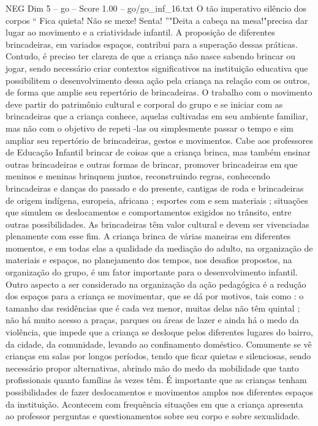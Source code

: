 \begin{textsample}{NEG Dim 5 – go – Score 1.00 – go/go\_inf\_16.txt}
O tão imperativo silêncio dos corpos “ Fica quieta!
Não se mexe!
Senta! ”"Deita a cabeça na mesa!"precisa dar lugar ao movimento e a criatividade infantil.
A proposição de diferentes brincadeiras, em variados espaços, contribui para a superação dessas práticas.
Contudo, é preciso ter clareza de que a criança não nasce sabendo brincar ou jogar, sendo necessário criar contextos significativos na instituição educativa que possibilitem o desenvolvimento dessa ação pela criança na relação com os outros, de forma que amplie seu repertório de brincadeiras.
O trabalho com o movimento deve partir do patrimônio cultural e corporal do grupo e se iniciar com as brincadeiras que a criança conhece, aquelas cultivadas em seu ambiente familiar, mas não com o objetivo de repeti -las ou simplesmente passar o tempo e sim ampliar seu repertório de brincadeiras, gestos e movimentos.
Cabe aos professores de Educação Infantil brincar de coisas que a criança brinca, mas também ensinar outras brincadeiras e outras formas de brincar, promover brincadeiras em que meninos e meninas brinquem juntos, reconstruindo regras, conhecendo brincadeiras e danças do passado e do presente, cantigas de roda e brincadeiras de origem indígena, europeia, africana ; esportes com e sem materiais ; situações que simulem os deslocamentos e comportamentos exigidos no trânsito, entre outras possibilidades.
As brincadeiras têm valor cultural e devem ser vivenciadas plenamente com esse fim.
A criança brinca de várias maneiras em diferentes momentos, e em todas elas a qualidade da mediação do adulto, na organização de materiais e espaços, no planejamento dos tempos, nos desafios propostos, na organização do grupo, é um fator importante para o desenvolvimento infantil.
Outro aspecto a ser considerado na organização da ação pedagógica é a redução dos espaços para a criança se movimentar, que se dá por motivos, tais como : o tamanho das residências que é cada vez menor, muitas delas não têm quintal ; não há muito acesso a praças, parques ou áreas de lazer e ainda há o medo da violência, que impede que a criança se desloque pelos diferentes lugares do bairro, da cidade, da comunidade, levando ao confinamento doméstico.
Comumente se vê crianças em salas por longos períodos, tendo que ficar quietas e silenciosas, sendo necessário propor alternativas, abrindo mão do medo da mobilidade que tanto profissionais quanto famílias às vezes têm.
É importante que as crianças tenham possibilidades de fazer deslocamentos e movimentos amplos nos diferentes espaços da instituição.
Acontecem com frequência situações em que a criança apresenta ao professor perguntas e questionamentos sobre seu corpo e sobre sexualidade.

\end{textsample}
